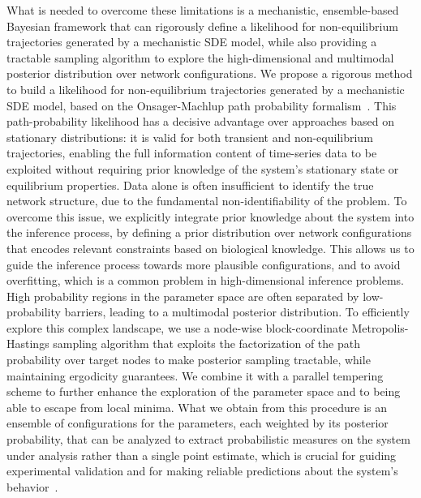 \documentclass[10pt, aps, rmp,  twocolumn, superscriptaddress, floatfix, showkeys]{revtex4-2}
\begin{document}
What is needed to overcome these limitations is a mechanistic, ensemble-based Bayesian framework that can rigorously define a likelihood for non-equilibrium trajectories generated by a mechanistic SDE model, while also providing a tractable sampling algorithm to explore the high-dimensional and multimodal posterior distribution over network configurations.
We propose a rigorous method to build a likelihood for non-equilibrium trajectories generated by a mechanistic SDE model, based on the Onsager-Machlup path probability formalism~\cite{onsager1953fluctuations}. This path-probability likelihood has a decisive advantage over approaches based on stationary distributions: it is valid for both transient and non-equilibrium trajectories, enabling the full information content of time-series data to be exploited without requiring prior knowledge of the system's stationary state or equilibrium properties.
Data alone is often insufficient to identify the true network structure, due to the fundamental non-identifiability of the problem. To overcome this issue, we explicitly integrate prior knowledge about the system into the inference process, by defining a prior distribution over network configurations that encodes relevant constraints based on biological knowledge. This allows us to guide the inference process towards more plausible configurations, and to avoid overfitting, which is a common problem in high-dimensional inference problems.
High probability regions in the parameter space are often separated by low-probability barriers, leading to a multimodal posterior distribution. To efficiently explore this complex landscape, we use a node-wise block-coordinate Metropolis-Hastings sampling algorithm that exploits the factorization of the path probability over target nodes to make posterior sampling tractable, while maintaining ergodicity guarantees. We combine it with a parallel tempering scheme to further enhance the exploration of the parameter space and to being able to escape from local minima.
What we obtain from this procedure is an ensemble of configurations for the parameters, each weighted by its posterior probability, that can be analyzed to extract probabilistic measures on the system under analysis rather than a single point estimate, which is crucial for guiding experimental validation and for making reliable predictions about the system's behavior~\cite{peel2022statistical}.
\end{document}
